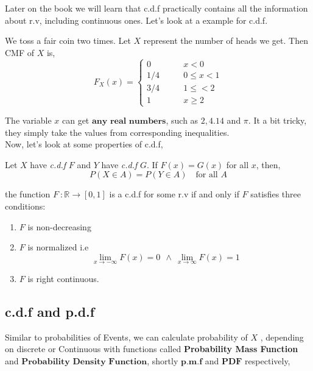 Later on the book we will learn that c.d.f practically contains all the information about r.v, including continuous ones. Let's look at a example for c.d.f.

\begin{example}
    We toss a fair coin two times. Let $X$ represent the number of heads we get. Then CMF of $X$ is,
    \[F_X(x) = 
        \begin{cases} 
          0 \qquad &x < 0\\
          1/4 \qquad &0 \le x <1 \\
          3/4 \qquad &1 \leq < 2 \\
          1 \qquad &x \ge 2
        \end{cases} 
\]
\end{example}

The variable $x$ can get $\textbf{any real numbers}$, such as $2, 4.14$ and $\pi$. It a bit tricky, they simply take the values from corresponding inequalities.
\\
Now, let's look at some properties of c.d.f,
\begin{theorem}
    Let $X$ have \textit{c.d.f} $F$ and $Y$  have \textit{c.d.f} $G$. If $F(x)=G(x)$ for all $x$, then,
    \[ P(X \in A) = P(Y \in A) \quad \text{for all $A$} \] 
\end{theorem}

\begin{theorem}
    the function $F \ : \mathbb{R} \rightarrow [0,1]$ is a c.d.f for some r.v if and only if $F$ satisfies three conditions:
    \begin{enumerate}
        \item $F$ is non-decreasing
        \item $F$ is normalized i.e \[ \lim_{x \rightarrow -\infty} F(x) = 0\ \ \land \ \lim_{x \rightarrow \infty} F(x) =1 \]
        \item $F$ is right continuous.
    \end{enumerate}
\end{theorem}

\subsection*{c.d.f and p.d.f}
Similar to probabilities of Events, we can calculate probability of $X$ , depending on discrete or Continuous with functions called \textbf{ Probability Mass Function} and $\textbf{Probability Density Function}$, shortly $\textbf{p.m.f}$ and $\textbf{PDF}$ respectively,

